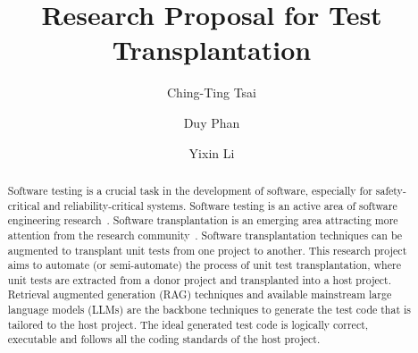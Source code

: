 \documentclass[sigconf]{acmart}
\begin{document}
\title{Research Proposal for Test Transplantation}

\author{Ching-Ting Tsai}

\author{Duy Phan}

\author{Yixin Li}


\renewcommand{\shortauthors}{Trovato et al.}

\begin{abstract}
%
Software testing is a crucial task in the development of software, especially for safety-critical and reliability-critical systems.
%
Software testing is an active area of software engineering research~\cite{alshahwan2023_softwaretestingchallenges}.
%
Software transplantation is an emerging area attracting more attention from the research community~\cite{alshahwan2023_softwaretestingchallenges}.
%
Software transplantation techniques can be augmented to transplant unit tests from one project to another. 
%
This research project aims to automate (or semi-automate) the process of unit test transplantation, where unit tests are extracted from a donor project and transplanted into a host project.
%
Retrieval augmented generation (RAG) techniques and available mainstream large language models (LLMs) are the backbone techniques to generate the test code that is tailored to the host project.
%
The ideal generated test code is logically correct, executable and follows all the coding standards of the host project.
%
\end{abstract}
\end{document}
